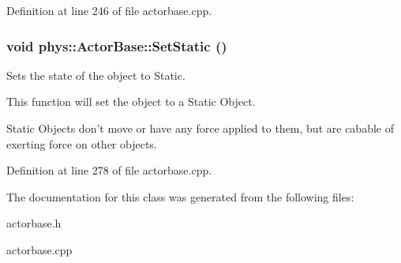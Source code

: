 Definition at line 246 of file actorbase.cpp.

\hypertarget{classphys_1_1ActorBase_af0219532fe71d1d84042a20a88fe5037}{
\subsubsection[{SetStatic}]{\setlength{\rightskip}{0pt plus 5cm}void phys::ActorBase::SetStatic ()}}
\label{d8/d0f/classphys_1_1ActorBase_af0219532fe71d1d84042a20a88fe5037}


Sets the state of the object to Static. 

This function will set the object to a Static Object. \par
 Static Objects don't move or have any force applied to them, but are cabable of exerting force on other objects. 

Definition at line 278 of file actorbase.cpp.



The documentation for this class was generated from the following files:\begin{DoxyCompactItemize}
\item 
actorbase.h\item 
actorbase.cpp\end{DoxyCompactItemize}
